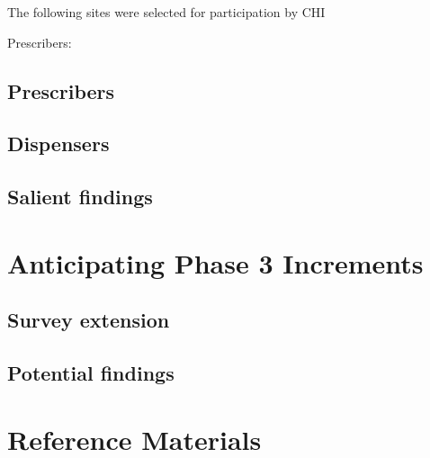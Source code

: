 \documentclass[10,letterpaper,]{article}
\begin{document}
The following sites were selected for participation by CHI

Prescribers:

\subsection{Prescribers}

\subsection{Dispensers}

\subsection{Salient findings}

\section{Anticipating Phase 3 Increments}

\subsection{Survey extension}

\subsection{Potential findings}

\section{Reference Materials}
\end{document}
